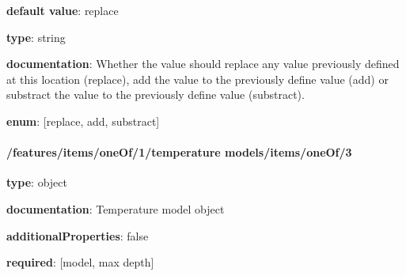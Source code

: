 \begin{itemized}
\item {\bf default value}: replace
\item {\bf type}: string
\item {\bf documentation}: Whether the value should replace any value previously defined at this location (replace), add the value to the previously define value (add) or substract the value to the previously define value (substract).
\item {\bf enum}: [replace, add, substract]\end{itemized}\paragraph{/features/items/oneOf/1/temperature models/items/oneOf/3} \begin{itemized}
\item {\bf type}: object
\item {\bf documentation}: Temperature model object
\item {\bf additionalProperties}: false
\item {\bf required}: [model, max depth]\end{itemized}
